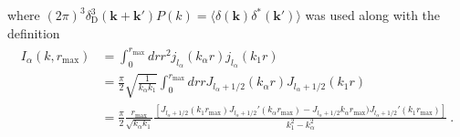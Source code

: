 \documentclass[11pt, oneside]{article}   	%
\newcommand{\jl}[1]{j_{l_#1}}
\begin{document}
where $(2 \pi)^3 \delta^3_\text{D}( \mathbf{k} + \mathbf{k}') P(k) =  \langle \delta(\mathbf{k}) \delta^*(\mathbf{k}') \rangle$ was used along with the definition 
\begin{align} 
\begin{split} 
I_\alpha(k,  r_\text{max}) & =  \int_0^{r_\text{max}}dr r^2 \jl{\alpha}(k_\alpha r) \jl{\alpha}( k_1 r) \\
& = \frac{\pi}{2} \sqrt{ \frac{1}{k _ \alpha k_1}} \int_0^{r_\text{max}}dr r J_{l_\alpha+ 1/2}(k_\alpha r)  J_{l_\alpha+ 1/2}( k_1 r) \\
& = \frac{\pi}{2} \frac{ r_\text{max}}{ \sqrt{ k _ \alpha k_1}}\frac{\left[J_{l_\alpha+ 1/2}( k_1  r_\text{max})J_{l_\alpha+ 1/2}'(k_\alpha  r_\text{max}) - J_{l_\alpha+ 1/2}k_\alpha  r_\text{max})J_{l_\alpha+ 1/2}'(k_1  r_\text{max})\right]}{k_1^2 - k_\alpha^2}~.
\end{split} 
\end{align}
\end{document}
